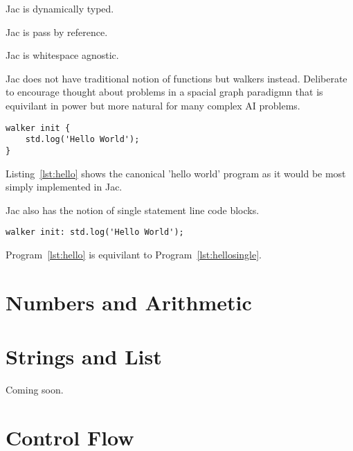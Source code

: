 Jac is dynamically typed.

Jac is pass by reference.

Jac is whitespace agnostic.

Jac does not have traditional notion of functions but walkers instead. Deliberate to encourage thought about problems in a spacial graph paradigmn that is equivilant in power but more natural for many complex AI problems.

\begin{lstlisting}[caption={Hello World},label={lst:hello}]
walker init {
    std.log('Hello World');
}
\end{lstlisting}

Listing~\ref{lst:hello} shows the canonical 'hello world' program as it would be most simply implemented in Jac.

Jac also has the notion of single statement line code blocks.

\begin{lstlisting}[caption={Hello World},label={lst:hellosingle}]
walker init: std.log('Hello World');
\end{lstlisting}


Program~\ref{lst:hello} is equivilant to Program~\ref{lst:hellosingle}.


\section{Numbers and Arithmetic}
\section{Strings and List} Coming soon.%
\section{Control Flow}
